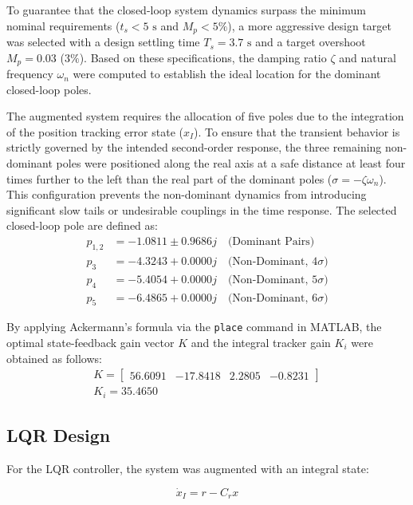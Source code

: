 \documentclass[journal,twocolumn]{IEEEtran}
\begin{document}
To guarantee that the closed-loop system dynamics surpass the minimum nominal requirements ($t_s < 5\text{ s}$ and $M_p < 5\%$), a more aggressive design target was selected with a design settling time $T_s = 3.7\text{ s}$ and a target overshoot $M_p = 0.03$ ($3\%$). Based on these specifications, the damping ratio $\zeta$ and natural frequency $\omega_n$ were computed to establish the ideal location for the dominant closed-loop poles.

The augmented system requires the allocation of five poles due to the integration of the position tracking error state ($x_I$). To ensure that the transient behavior is strictly governed by the intended second-order response, the three remaining non-dominant poles were positioned along the real axis at a safe distance at least four times further to the left than the real part of the dominant poles ($\sigma = -\zeta\omega_n$). This configuration prevents the non-dominant dynamics from introducing significant slow tails or undesirable couplings in the time response. The selected closed-loop pole are defined as:
\begin{align*}
    p_{1,2} &= -1.0811 \pm 0.9686j \quad \text{(Dominant Pairs)} \\
    p_3     &= -4.3243 + 0.0000j \quad \text{(Non-Dominant, $4\sigma$)} \\
    p_4     &= -5.4054 + 0.0000j \quad \text{(Non-Dominant, $5\sigma$)} \\
    p_5     &= -6.4865 + 0.0000j \quad \text{(Non-Dominant, $6\sigma$)}
\end{align*}

By applying Ackermann's formula via the \texttt{place} command in MATLAB, the optimal state-feedback gain vector $K$ and the integral tracker gain $K_i$ were obtained as follows:
\begin{gather*}
    K = \begin{bmatrix} 56.6091 & -17.8418 & 2.2805 & -0.8231 \end{bmatrix} \\
    K_i = 35.4650
\end{gather*}

\subsection{LQR Design}

For the LQR controller, the system was augmented with an
integral state:

\begin{equation}
\dot{x}_I = r - C_r x
\end{equation}
\end{document}
